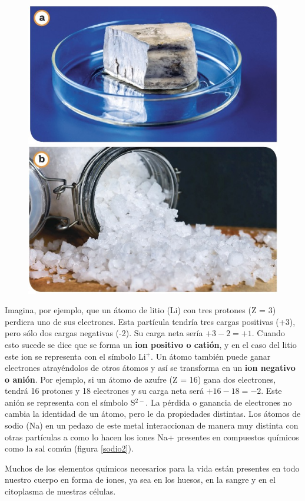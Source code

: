\documentclass[11pt]{book}
\begin{document}
\begin{figure}[H]
  \centering
  \includegraphics[width=0.40\linewidth]{sodio.jpg}\includegraphics[width=0.40\linewidth]{sodio2.jpg}
  \label{fig:sodio2}
\end{figure}%

Imagina, por ejemplo, que un átomo de litio (Li) con tres protones (Z = 3) perdiera uno de sus electrones.
Esta partícula tendría tres cargas positivas (+3), pero sólo dos cargas negativas (-2).
Su carga neta sería $+3 - 2 = +1$. Cuando esto sucede se dice que se forma un \textbf{ion positivo o catión},
y en el caso del litio este ion se representa con el símbolo Li$^+$. Un átomo también puede ganar electrones
atrayéndolos de otros átomos y así se transforma en un \textbf{ion negativo o anión}. Por ejemplo, si un átomo de
azufre (Z = 16) gana dos electrones, tendrá 16 protones y 18 electrones y su carga neta será $+16 - 18 = -2$.
Este anión se representa con el símbolo S$^{2-}$. La pérdida o ganancia de electrones no cambia la identidad de un
átomo, pero le da propiedades distintas. Los átomos de sodio (Na) en un pedazo de este metal interaccionan de
manera muy distinta con otras partículas a como lo hacen los iones Na+ presentes en compuestos químicos como
la sal común (figura \ref{sodio2}).


Muchos de los elementos químicos necesarios para la vida están presentes en todo nuestro cuerpo en forma de
iones, ya sea en los huesos, en la sangre y en el citoplasma de nuestras células.
\end{document}
